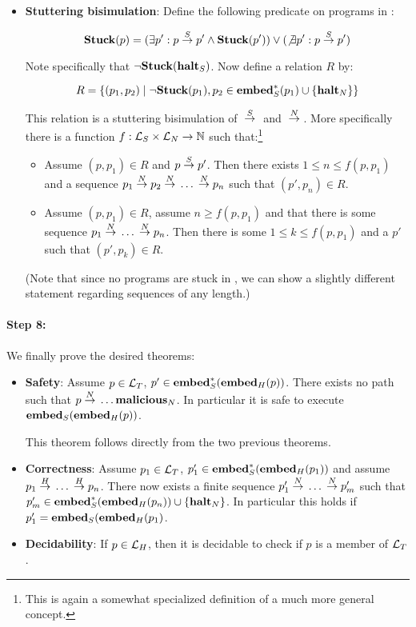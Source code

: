 \begin{itemize}
\item \textbf{Stuttering bisimulation}: Define the following predicate on
  programs in \simplelang:

  $$\mathbf{Stuck}(p) = (\exists p': p {{}\stackrel{S}{->}{}} p' \land \mathbf{Stuck}(p')) \lor (\not\exists p': p {{}\stackrel{S}{->}{}} p')$$

  Note specifically that $\neg\mathbf{Stuck}({\mathbf{halt}_S})$. Now define a relation $R$
  by:

  $$R = \{(p_1, p_2) \mid \neg\mathbf{Stuck}(p_1), p_2 \in {\ensuremath{\mathbf{embed}^\ast_S}}(p_1) \cup \{{\mathbf{halt}_N}\}\}$$

  This relation is a stuttering bisimulation of ${{}\stackrel{S}{->}{}}$ and
  ${{}\stackrel{N}{->}{}}$. More specifically there is a function
  $f : \mathcal{L}_S \times \mathcal{L}_N \to \mathbb{N}$ such that:\footnote{This is
    again a somewhat specialized definition of a much more general concept.}

  \begin{itemize}
  \item Assume $(p, p_1) \in R$ and $p {{}\stackrel{S}{->}{}} p'$. Then there exists
    $1 \leq n \leq f(p, p_1)$ and a sequence
    $p_1 {{}\stackrel{N}{->}{}} p_2 {{}\stackrel{N}{->}{}} \dots {{}\ensuremath{\stackrel{N}{->}}{}} p_n$ such that
    $(p', p_n) \in R$.
  \item Assume $(p, p_1) \in R$, assume $n \geq f(p, p_1)$ and that there is
    some sequence $p_1 {{}\stackrel{N}{->}{}} \dots {{}\ensuremath{\stackrel{N}{->}}{}} p_n$. Then there is some
    $1 \leq k \leq f(p, p_1)$ and a $p'$ such that $(p', p_k) \in R$.
  \end{itemize}

  (Note that since no programs are stuck in \nativelang, we can show a slightly
  different statement regarding sequences of any length.)
\end{itemize}

\paragraph{Step 8:} We finally prove the desired theorems:
\begin{itemize}
\item \textbf{Safety}: Assume $p \in \mathcal{L}_T$,
  $p' \in {\ensuremath{\mathbf{embed}^\ast_S}}({{\mathbf{embed}}_H}(p))$. There exists no path such that
  $p {{}\stackrel{N}{->}{}} \dots {\ensuremath{{\mathbf{malicious}}_N}}$. In particular it is safe to
  execute ${{\mathbf{embed}}_S}({{\mathbf{embed}}_H}(p))$.

  This theorem follows directly from the two previous theorems.

\item \textbf{Correctness}: Assume $p_1 \in \mathcal{L}_T$,
  $p_1' \in {\ensuremath{\mathbf{embed}^\ast_S}}({{\mathbf{embed}}_H}(p_1))$ and assume
  $p_1 {{}\stackrel{H}{->}{}} \dots {{}\ensuremath{\stackrel{H}{->}}{}} p_n$. There now exists a finite sequence
  $p_1' {{}\stackrel{N}{->}{}} \dots {{}\ensuremath{\stackrel{N}{->}}{}} p_m'$ such that
  $p_m' \in {\ensuremath{\mathbf{embed}^\ast_S}}({{\mathbf{embed}}_H}(p_n)) \cup \{{\mathbf{halt}_N}\}$. In
  particular this holds if $p_1' = {{\mathbf{embed}}_S}({{\mathbf{embed}}_H}(p_1)$.

\item \textbf{Decidability}: If $p \in \mathcal{L}_H$, then it is decidable to check
  if $p$ is a member of $\mathcal{L}_T$.
\end{itemize}

